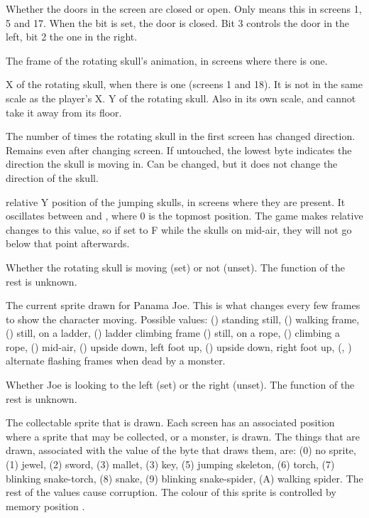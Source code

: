 {\begin{enumerate}
 Whether the doors in the screen are closed or
open. Only means this in screens 1, 5 and 17. When the bit is set, the door is
closed. Bit 3 controls the door in the left, bit 2 the one in the right.

 The frame of the rotating skull's animation, in
screens where there is one.

 X of the rotating skull, when there is one (screens
1 and 18). It is not in the same scale as the player's X.
 Y of the rotating skull. Also in its own scale, and
cannot take it away from its floor.

 The number of times the rotating skull in the
first screen has changed direction. Remains even after changing screen. If
untouched, the lowest byte indicates the direction the skull is moving in. Can
be changed, but it does not change the direction of the skull.

 relative Y position of the jumping skulls, in screens where they are present.
It oscillates between  and , where 0 is the topmost position. The
game makes relative changes to this value, so if set to F while the skulls on
mid-air, they will not go below that point afterwards.

 Whether the rotating skull is moving (set) or
not (unset). The function of the rest is unknown.

 The current sprite drawn for Panama Joe. This is what
changes every few frames to show the character moving. Possible values: ()
standing still, () walking frame, () still, on a ladder, ()
ladder climbing frame () still, on a rope, () climbing a rope,
() mid-air, () upside down, left foot up, () upside down,
right foot up, (, ) alternate flashing frames when dead by a monster.

 Whether Joe is looking to the left (set) or the
right (unset). The function of the rest is unknown.

 The collectable sprite that is drawn. Each screen has
an associated position where a sprite that may be collected, or a monster, is
drawn. The things that are drawn, associated with the value of the byte that
draws them, are: (0) no sprite, (1) jewel, (2) sword, (3) mallet, (3) key, (5) jumping
skeleton, (6) torch, (7) blinking snake-torch, (8) snake, (9) blinking
snake-spider, (A) walking spider. The rest of the values cause corruption. The
colour of this sprite is controlled by memory position
\hyperref[ram:collectable-colour]{}.


\end{enumerate}}

